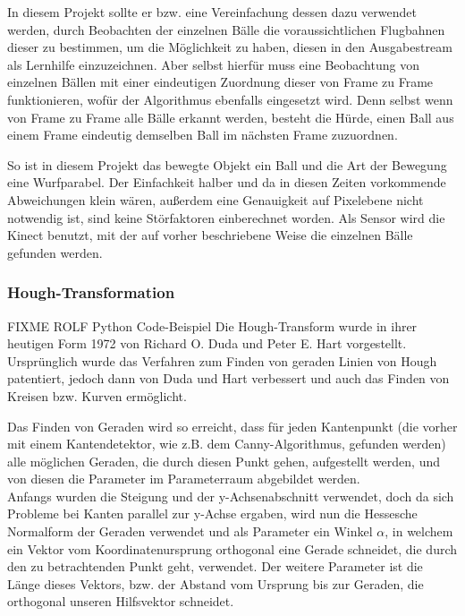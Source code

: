 \documentclass[12pt,a4paper,ngerman]{scrartcl}
\begin{document}
In diesem Projekt sollte er bzw. eine Vereinfachung dessen dazu verwendet werden, durch Beobachten der einzelnen Bälle die voraussichtlichen Flugbahnen dieser zu bestimmen, um die Möglichkeit zu haben, diesen in den Ausgabestream als Lernhilfe einzuzeichnen. Aber selbst hierfür muss eine Beobachtung von einzelnen Bällen mit einer eindeutigen Zuordnung dieser von Frame zu Frame funktionieren, wofür der Algorithmus ebenfalls eingesetzt wird. Denn selbst wenn von Frame zu Frame alle Bälle erkannt werden, besteht die Hürde, einen Ball aus einem Frame eindeutig demselben Ball im nächsten Frame zuzuordnen.

So ist in diesem Projekt das bewegte Objekt ein Ball und die Art der Bewegung eine Wurfparabel. Der Einfachkeit halber und da in diesen Zeiten vorkommende Abweichungen klein wären, außerdem eine Genauigkeit auf Pixelebene nicht notwendig ist, sind keine Störfaktoren einberechnet worden. Als Sensor wird die Kinect benutzt, mit der auf vorher beschriebene Weise die einzelnen Bälle gefunden werden.

\subsubsection{Hough-Transformation}
{\color{red} FIXME ROLF Python Code-Beispiel}
Die Hough-Transform wurde in ihrer heutigen Form 1972 von Richard O. Duda und Peter E. Hart\cite{hough} vorgestellt.\\
Ursprünglich wurde das Verfahren zum Finden von geraden Linien von Hough patentiert, jedoch dann von Duda und Hart verbessert und auch das Finden von Kreisen bzw. Kurven ermöglicht.

Das Finden von Geraden wird so erreicht, dass für jeden Kantenpunkt (die vorher mit einem Kantendetektor, wie z.B. dem Canny-Algorithmus, gefunden werden) alle möglichen Geraden, die durch diesen Punkt gehen, aufgestellt werden, und von diesen die Parameter im Parameterraum abgebildet werden.\\
Anfangs wurden die Steigung und der y-Achsenabschnitt verwendet, doch da sich Probleme bei Kanten parallel zur y-Achse ergaben, wird nun die Hessesche Normalform der Geraden verwendet und als Parameter ein Winkel $\alpha$, in welchem ein Vektor vom Koordinatenursprung orthogonal eine Gerade schneidet, die durch den zu betrachtenden Punkt geht, verwendet. Der weitere Parameter ist die Länge dieses Vektors, bzw. der Abstand vom Ursprung bis zur Geraden, die orthogonal unseren Hilfsvektor schneidet.
\end{document}
